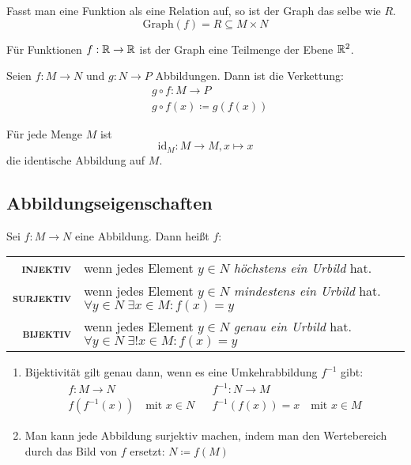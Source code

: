 Fasst man eine Funktion als eine Relation auf, so ist der Graph das selbe wie $R$.
\begin{equation*}
	\mathrm{Graph}(f)=R\subseteq M\times N
\end{equation*}

\bemerkung Für Funktionen $f:\mathbb{R}\rightarrow\mathbb{R}$ ist der Graph eine Teilmenge der Ebene $\mathbb{R}^2$.

Seien $f:M\rightarrow N$ und $g:N\rightarrow P$ Abbildungen. Dann ist die Verkettung:
\begin{align*}
  &g\circ f:M\rightarrow P\\
  &g\circ f(x)\coloneqq g(f(x))
\end{align*}

Für jede Menge $M$ ist
\begin{equation*}
  \mathrm{id}_M:M\rightarrow M, x\mapsto x
\end{equation*}
die identische Abbildung auf $M$.

\subsection{Abbildungseigenschaften}
Sei $f:M\rightarrow N$ eine Abbildung. Dann heißt $f$:

\medskip
\renewcommand{\arraystretch}{1.4}
\begin{tabular}{>{\bfseries\scshape}r l}
	injektiv & wenn jedes Element $y\in N$ \emph{höchstens ein Urbild} hat.\\
	surjektiv & wenn jedes Element $y\in N$ \emph{mindestens ein Urbild} hat. $\forall y\in N\; \exists x\in M : f(x) = y$\\
	bijektiv & wenn jedes Element $y\in N$ \emph{genau ein Urbild} hat. $\forall y\in N\; \exists! x\in M : f(x) = y$
\end{tabular}
\medskip

\bemerkung
\begin{enumerate}
  \item Bijektivität gilt genau dann, wenn es eine Umkehrabbildung $f^{-1}$ gibt:
  \begin{align*}
    f:M\rightarrow N && f^{-1}:N\rightarrow M\\
    f\left(f^{-1}(x)\right) \quad\text{mit }x\in N && f^{-1}\left(f(x)\right)=x \quad\text{mit }x\in M
  \end{align*}
  \item Man kann jede Abbildung surjektiv machen, indem man den Wertebereich durch das Bild von $f$ ersetzt: $N\coloneqq f(M)$
\end{enumerate}

